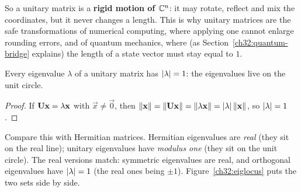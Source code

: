 So a unitary matrix is a \textbf{rigid motion of $\mathbb{C}^n$}: it may rotate, reflect
and mix the coordinates, but it never changes a length. This is why unitary
matrices are the safe transformations of numerical computing, where applying one
cannot enlarge rounding errors, and of quantum mechanics, where (as
Section~\ref{ch32:quantum-bridge} explains) the length of a state vector must stay
equal to $1$.

\begin{corollary}\label{ch32:unitaryeig}
Every eigenvalue $\lambda$ of a unitary matrix has $\lvert\lambda\rvert = 1$: the
eigenvalues live on the unit circle.
\end{corollary}

\begin{proof}
If $\mathbf{U}\mathbf{x}=\lambda\mathbf{x}$ with $\vec x\ne\vec 0$, then
$\lVert\mathbf{x}\rVert = \lVert\mathbf{U}\mathbf{x}\rVert = \lVert\lambda\mathbf{x}\rVert =
\lvert\lambda\rvert\,\lVert\mathbf{x}\rVert$, so $\lvert\lambda\rvert = 1$.
\end{proof}

Compare this with Hermitian matrices. Hermitian eigenvalues are
\emph{real} (they sit on the real line); unitary eigenvalues have \emph{modulus
one} (they sit on the unit circle). The real versions match:
symmetric eigenvalues are real, and orthogonal eigenvalues have $\lvert\lambda\rvert=1$ (the
real ones being $\pm 1$). Figure~\ref{ch32:eiglocus} puts the
two sets side by side.


